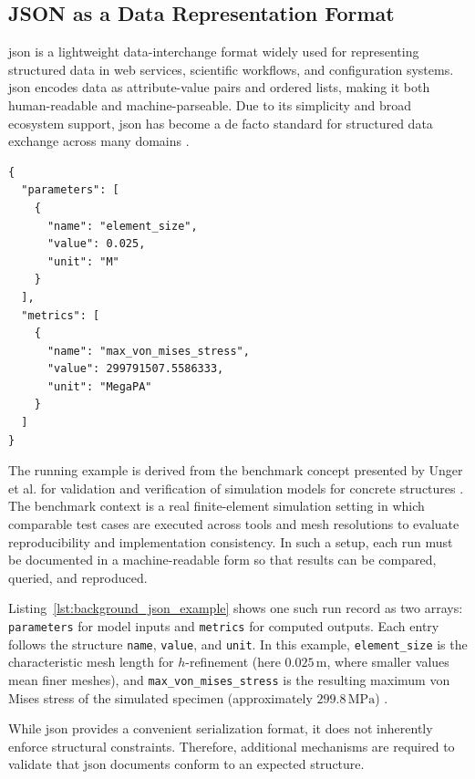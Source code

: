\subsection{JSON as a Data Representation Format}
\label{sec:background:json}

\gls{json} is a lightweight data-interchange format widely used for representing structured data in web services, scientific workflows, and configuration systems. \gls{json} encodes data as attribute-value pairs and ordered lists, making it both human-readable and machine-parseable. Due to its simplicity and broad ecosystem support, \gls{json} has become a de facto standard for structured data exchange across many domains \cite{json_standard}.

\begin{lstlisting}[float=htbp,style=json,caption={Example JSON representation of simulation input parameters and results}, label={lst:background_json_example}]
{
  "parameters": [
    {
      "name": "element_size",
      "value": 0.025,
      "unit": "M"
    }
  ],
  "metrics": [
    {
      "name": "max_von_mises_stress",
      "value": 299791507.5586333,
      "unit": "MegaPA"
    }
  ]
}
\end{lstlisting}

The running example is derived from the benchmark concept presented by Unger et al. for validation and verification of simulation models for concrete structures \cite{Unger2026Platform}. The benchmark context is a real finite-element simulation setting in which comparable test cases are executed across tools and mesh resolutions to evaluate reproducibility and implementation consistency. In such a setup, each run must be documented in a machine-readable form so that results can be compared, queried, and reproduced.

Listing~\ref{lst:background_json_example} shows one such run record as two arrays: \texttt{parameters} for model inputs and \texttt{metrics} for computed outputs. Each entry follows the structure \texttt{name}, \texttt{value}, and \texttt{unit}. In this example, \texttt{element\_size} is the characteristic mesh length for \(h\)-refinement (here \(0.025\,\mathrm{m}\), where smaller values mean finer meshes), and \texttt{max\_von\_mises\_stress} is the resulting maximum von Mises stress of the simulated specimen (approximately \(299.8\,\mathrm{MPa}\)) \cite{Unger2026Platform}. 

While \gls{json} provides a convenient serialization format, it does not inherently enforce structural constraints. Therefore, additional mechanisms are required to validate that \gls{json} documents conform to an expected structure.

